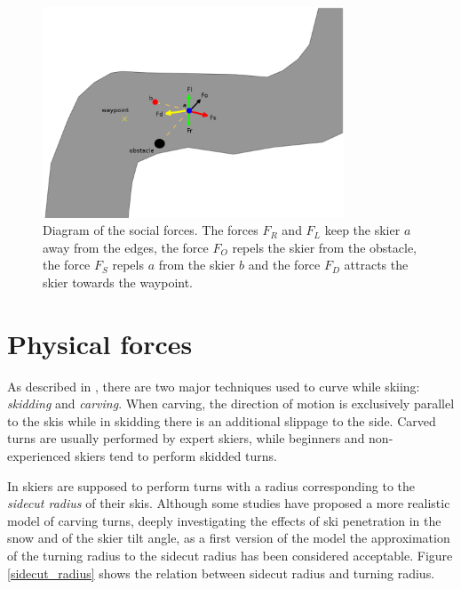 \documentclass[12pt,a4paper,twoside]{book}
\begin{document}
\begin{figure}
  \begin{center}
    \includegraphics[width=0.8\textwidth]{images/social_forces_dia.eps}
    \caption{Diagram of the social forces. The forces $F_R$ and $F_L$ keep the skier $a$ away from the edges, the force $F_O$ repels the skier from the obstacle, the force $F_S$ repels $a$ from the skier $b$ and the force $F_D$ attracts the skier towards the waypoint.}\label{social_forces_diagram}
  \end{center}
\end{figure}


\section{Physical forces}
As described in \cite{hol2012}, there are two major techniques used to curve while skiing: \textit{skidding} and \textit{carving}. When carving, the direction of motion is exclusively parallel to the skis while in skidding there is an additional slippage to the side. Carved turns are usually performed by expert skiers, while beginners and non-experienced skiers tend to perform skidded turns.

In \cite{hol2012} skiers are supposed to perform turns with a radius corresponding to the \textit{sidecut radius} of their skis. Although some studies \cite{jen2004} \cite{fe2010} have proposed a more realistic model of carving turns, deeply investigating the effects of ski penetration in the snow and of the skier tilt angle, as a first version of the model the approximation of the turning radius to the sidecut radius has been considered acceptable. Figure \ref{sidecut_radius} shows the relation between sidecut radius and turning radius.
\end{document}
